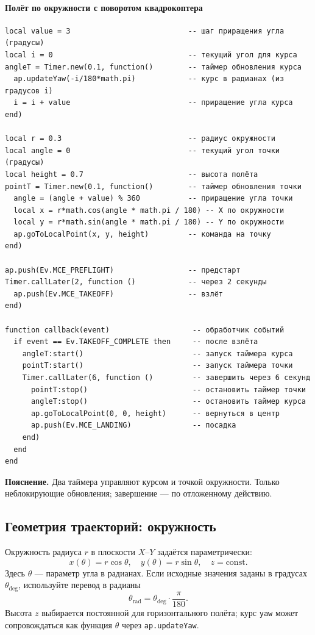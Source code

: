 \paragraph{Полёт по окружности с поворотом квадрокоптера}
\begin{verbatim}
local value = 3                           -- шаг приращения угла (градусы)
local i = 0                               -- текущий угол для курса
angleT = Timer.new(0.1, function()        -- таймер обновления курса
  ap.updateYaw(-i/180*math.pi)            -- курс в радианах (из градусов i)
  i = i + value                           -- приращение угла курса
end)

local r = 0.3                             -- радиус окружности
local angle = 0                           -- текущий угол точки (градусы)
local height = 0.7                        -- высота полёта
pointT = Timer.new(0.1, function()        -- таймер обновления точки
  angle = (angle + value) % 360           -- приращение угла точки
  local x = r*math.cos(angle * math.pi / 180) -- X по окружности
  local y = r*math.sin(angle * math.pi / 180) -- Y по окружности
  ap.goToLocalPoint(x, y, height)         -- команда на точку
end)

ap.push(Ev.MCE_PREFLIGHT)                 -- предстарт
Timer.callLater(2, function ()            -- через 2 секунды
  ap.push(Ev.MCE_TAKEOFF)                 -- взлёт
end)

function callback(event)                   -- обработчик событий
  if event == Ev.TAKEOFF_COMPLETE then     -- после взлёта
    angleT:start()                         -- запуск таймера курса
    pointT:start()                         -- запуск таймера точки
    Timer.callLater(6, function ()         -- завершить через 6 секунд
      pointT:stop()                        -- остановить таймер точки
      angleT:stop()                        -- остановить таймер курса
      ap.goToLocalPoint(0, 0, height)      -- вернуться в центр
      ap.push(Ev.MCE_LANDING)              -- посадка
    end)
  end
end
\end{verbatim}
\textbf{Пояснение.} Два таймера управляют курсом и точкой окружности. Только неблокирующие обновления; завершение — по отложенному действию.

\subsection{Геометрия траекторий: окружность}
Окружность радиуса \(r\) в плоскости \(X\)–\(Y\) задаётся параметрически:
\[
  x(\theta) = r \cos\theta,\quad y(\theta) = r \sin\theta,\quad z = \text{const}.
\]
Здесь \(\theta\) — параметр угла в радианах. Если исходные значения заданы в градусах \(\theta_{\mathrm{deg}}\), используйте перевод в радианы
\[
  \theta_{\mathrm{rad}} = \theta_{\mathrm{deg}} \cdot \frac{\pi}{180}.
\]
Высота \(z\) выбирается постоянной для горизонтального полёта; курс \texttt{yaw} может сопровождаться как функция \(\theta\) через \texttt{ap.updateYaw}.

